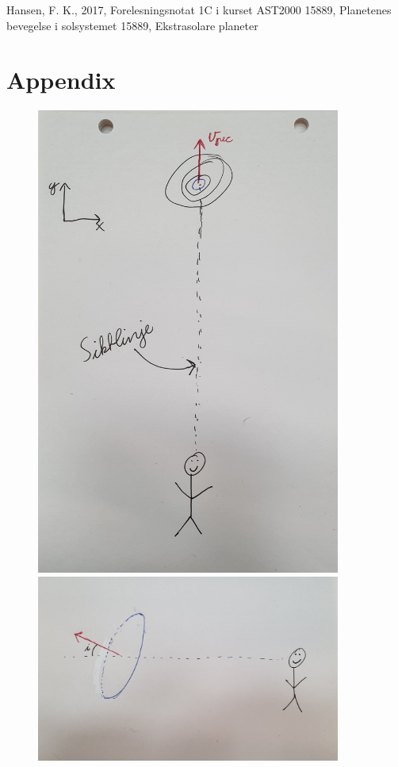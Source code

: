 \documentclass[reprint, english,notitlepage]{revtex4-1}  %
\begin{document}
\onecolumngrid
\vspace{1cm} %


\begin{thebibliography}{}
 Hansen, F. K.,  2017, Forelesningsnotat 1C i kurset AST2000
 15889, Planetenes bevegelse i solsystemet
 15889, Ekstrasolare planeter


\end{thebibliography}


\section{Appendix}

\begin{figure}
  \includegraphics[width=10cm]{../output/line_of_sight2.jpg}
  \includegraphics[width=10cm]{../output/line_of_sight1.jpg}

\end{figure}
\end{document}
